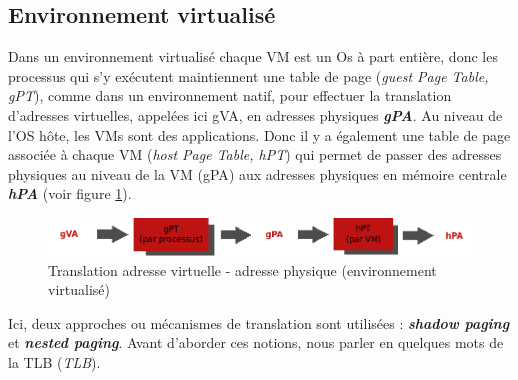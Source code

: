 \subsection{Environnement virtualisé}
Dans un environnement virtualisé chaque VM est un Os à part entière, donc les processus qui s'y exécutent maintiennent une table de page (\textit{guest Page Table, gPT}), comme dans un environnement natif, pour effectuer la translation d'adresses virtuelles, appelées ici \ac{gVA}, en adresses physiques \textit{\textbf{\ac{gPA}}}. Au niveau de l'OS hôte, les VMs sont des applications. Donc il y a également une table de page associée à chaque VM (\textit{host Page Table, hPT}) qui permet de passer des adresses physiques au niveau de la VM (\acs{gPA}) aux adresses physiques en mémoire centrale \textit{\textbf{\ac{hPA}}} (voir figure \ref{fig:vaddr_paddr_virt}).
\begin{figure}[htp]
    \centering
    \includegraphics[width=1\linewidth]{chapters/1/fig1/vaddr_paddr_virt}
    \caption{Translation adresse virtuelle - adresse physique (environnement virtualisé)}
    \label{fig:vaddr_paddr_virt}
\end{figure}

Ici, deux approches ou mécanismes de translation sont utilisées : \textit{\textbf{shadow paging}} et \textit{\textbf{nested paging}}. Avant d'aborder ces notions, nous parler en quelques mots de la TLB (\textit{\acl{TLB}}). 

